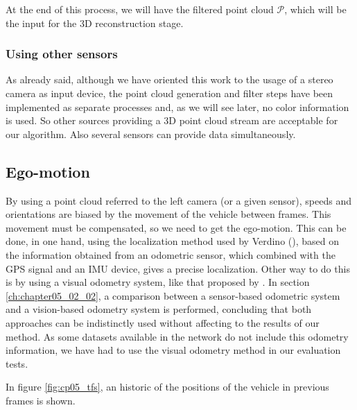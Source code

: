 At the end of this process, we will have the filtered point cloud $\mathcal{P}$, which will be the input for the 3D reconstruction stage.

\subsubsection{Using other sensors}\label{ch:chapter05_01_01_02}

As already said, although we have oriented this work to the usage of a stereo camera as input device, the point cloud generation and filter steps have been implemented as separate processes and, as we will see later, no color information is used. So other sources providing a 3D point cloud stream are acceptable for our algorithm. Also several sensors can provide data simultaneously.

\subsection{Ego-motion}\label{ch:chapter05_01_02}

By using a point cloud referred to the left camera (or a given sensor), speeds and orientations are biased by the movement of the vehicle between frames. This movement must be compensated, so we need to get the ego-motion. This can be done, in one hand, using the localization method used by Verdino (\cite{Perea2013mcl}), based on the information obtained from an odometric sensor, which combined with the \acs{GPS} signal and an \ac{IMU} device, gives a precise localization. Other way to do this is by using a visual odometry system, like that proposed by \cite{geiger2011stereoscan}. In section \ref{ch:chapter05_02_02}, a comparison between a sensor-based odometric system and a vision-based odometry system is performed, concluding that both approaches can be indistinctly used without affecting to the results of our method. As some datasets available in the network do not include this odometry information, we have had to use the visual odometry method in our evaluation tests.

In figure \ref{fig:cp05_tfs}, an historic of the positions of the vehicle in previous frames is shown.

